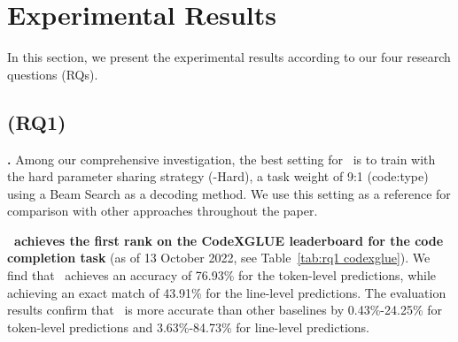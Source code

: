 \section{Experimental Results}\label{sec:results}

In this section, we present the experimental results according to our four research questions (RQs).

\subsection*{\textbf{(RQ1) \rqone}}





\indent \textbf{\our.} Among our comprehensive investigation, the best setting for \our~is to train with the hard parameter sharing strategy (\our-Hard), a task weight of 9:1 (code:type) using a Beam Search as a decoding method.
We use this setting as a reference for comparison with other approaches throughout the paper.

\textbf{\our~achieves the first rank on the CodeXGLUE leaderboard for the code completion task} (as of 13 October 2022, see Table~\ref{tab:rq1 codexglue}).
We find that \our~achieves an accuracy of 76.93\% for the token-level predictions, while achieving an exact match of 43.91\% for the line-level predictions.
The evaluation results confirm that  \our~is more accurate than other baselines by 0.43\%-24.25\% for token-level predictions and 3.63\%-84.73\% for line-level predictions.

